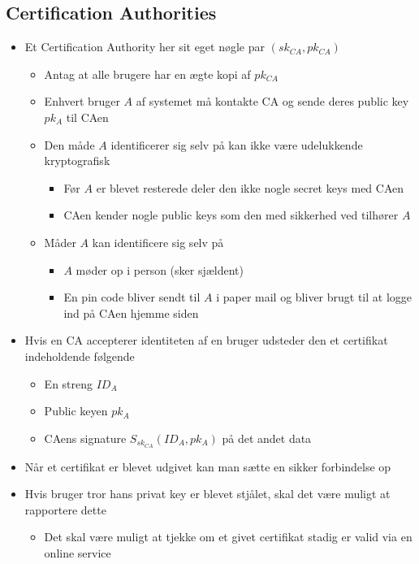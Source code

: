 \documentclass[a4, english]{article}
\begin{document}
\subsection{Certification Authorities}
\begin{itemize}
	\item Et Certification Authority her sit eget nøgle par $(sk_{CA}, pk_{CA})$ 
  \begin{itemize}
  	\item Antag at alle brugere har en ægte kopi af $pk_{CA}$
    \item Enhvert bruger $A$ af systemet må kontakte CA og sende deres public key $pk_A$ til CAen
    \item Den måde $A$ identificerer sig selv på kan ikke være udelukkende kryptografisk   
    \begin{itemize}
    	\item Før $A$ er blevet resterede deler den ikke nogle secret keys med CAen 
      \item CAen kender nogle public keys som den med sikkerhed ved tilhører $A$  
    \end{itemize}
    \item Måder $A$ kan identificere sig selv på 
    \begin{itemize}
    	\item $A$ møder op i person (sker sjældent)
      \item En pin code bliver sendt til $A$ i paper mail og bliver brugt til at logge ind på CAen hjemme siden 
    \end{itemize} 
  \end{itemize}
  \item Hvis en CA accepterer identiteten af en bruger udsteder den et certifikat indeholdende følgende
  \begin{itemize}
		\item En streng $ID_A$
		\item Public keyen $pk_A$
		\item CAens signature $S_{sk_{CA}}(ID_A,pk_A)$ på det andet data    
  \end{itemize}
  \item Når et certifikat er blevet udgivet kan man sætte en sikker forbindelse op 
  \item Hvis bruger tror hans privat key er blevet stjålet, skal det være muligt at rapportere dette
  \begin{itemize}
  	\item Det skal være muligt at tjekke om et givet certifikat stadig er valid via en online service

\end{itemize}
\end{itemize}
\end{document}
